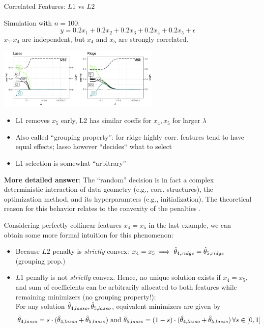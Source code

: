 \documentclass[11pt,compress,t,notes=noshow, xcolor=table]{beamer}
\begin{document}
\begin{vbframe}{Correlated Features: $L1$ vs $L2$}


Simulation with $n=100$: 
$$y = 0.2x_1 + 0.2x_2 + 0.2x_3 + 0.2x_4 + 0.2x_5 + \epsilon$$
$x_1$-$x_4$ are independent, but $x_4$ and $x_5$ are strongly correlated.

\begin{center}
\includegraphics[width=0.6\textwidth]{figure/multicollinearity_example.png}
\end{center}


\begin{itemize}
\item L1 removes $x_5$ early, L2 has similar coeffs for $x_4, x_5$ for larger $\lambda$
\item Also called ``grouping property'': for ridge highly corr. features tend to have equal effects; lasso however ``decides`` what to select
\item L1 selection is somewhat ``arbitrary''
\end{itemize}

\framebreak

\textbf{More detailed answer}: The ``random'' decision is in fact a complex deterministic interaction of data geometry (e.g., corr. structures), the optimization method, and its hyperparamters (e.g., initialization). The theoretical reason for this behavior relates to the convexity of the penalties .

\vspace{0.1cm}

Considering perfectly collinear features $x_4=x_5$ in the last example, we can obtain some more formal intuition for this phenomenon:
\vspace{0.15cm}
\begin{itemize}
    \item Because $L2$ penalty is \textit{strictly} convex: $x_4=x_5 \implies \hat{\theta}_{4, ridge}=\hat{\theta}_{5, ridge}$ (grouping prop.)
    \item $L1$ penalty is not \textit{strictly} convex. Hence, no unique solution exists if $x_4=x_5$, and sum of coefficients can be arbitrarily allocated to both features while remaining minimizers (no grouping property!):\\
    For any solution $\hat{\theta}_{4,lasso},\hat{\theta}_{5,lasso}$, equivalent minimizers are given by 
    \vspace{-0.1cm}
    {\footnotesize $$\Tilde{\theta}_{4,lasso}=s\cdot(\hat{\theta}_{4,lasso}+\hat{\theta}_{5,lasso}) \,\,\text{and}\,\,\Tilde{\theta}_{5,lasso}=(1-s)\cdot(\hat{\theta}_{4,lasso}+\hat{\theta}_{5,lasso})\,\forall s\in[0,1]$$}
\end{itemize}


\end{vbframe}
\end{document}
